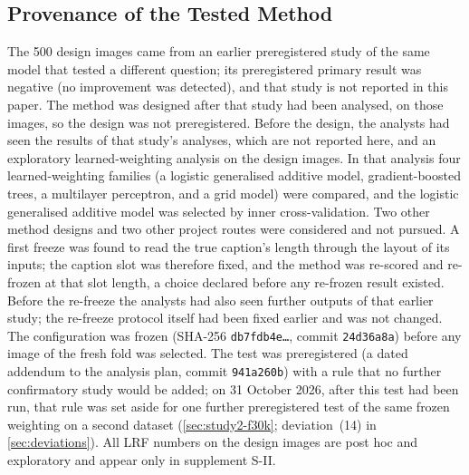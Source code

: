 \subsection{Provenance of the Tested Method}\label{sec:study2-provenance}
The 500 design images came from an earlier preregistered study of the same model that tested a different question; its preregistered primary result was negative (no improvement was detected), and that study is not reported in this paper.
The method was designed after that study had been analysed, on those images, so the design was not preregistered.
Before the design, the analysts had seen the results of that study's analyses, which are not reported here, and an exploratory
learned-weighting analysis on the design images.
In that analysis four learned-weighting families (a logistic generalised additive model, gradient-boosted trees, a multilayer perceptron,
and a grid model) were compared, and the logistic generalised additive model was selected by inner cross-validation.
Two other method designs and two other project routes were considered and not pursued.
A first freeze was found to read the true caption's length through the layout of its inputs; the caption slot was therefore fixed, and
the method was re-scored and re-frozen at that slot length, a choice declared before any re-frozen result existed.
Before the re-freeze the analysts had also seen further outputs of that earlier study; the re-freeze protocol itself had been fixed earlier and was not changed.
The configuration was frozen (SHA-256 \texttt{db7fdb4e\ldots}, commit \texttt{24d36a8a}) before any image of the fresh fold was selected.
The test was preregistered (a dated addendum to the analysis plan, commit \texttt{941a260b}) with a rule that no further confirmatory study would be added; on 31 October 2026, after this test had been run, that rule was set aside for one further preregistered test of the same frozen weighting on a second dataset (\cref{sec:study2-f30k}; deviation~(14) in \cref{sec:deviations}).
All LRF numbers on the design images are post hoc and exploratory and appear only in supplement S-II.

